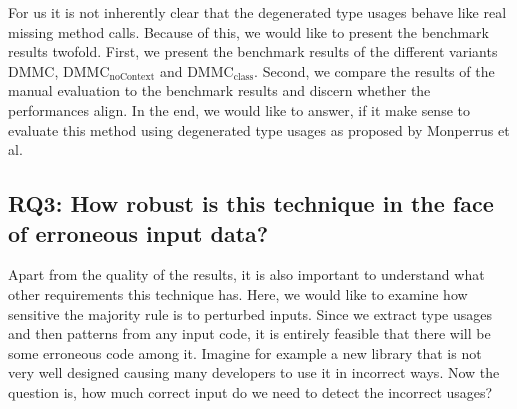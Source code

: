 For us it is not inherently clear that the degenerated type usages behave like real missing method calls.
Because of this, we would like to present the benchmark results twofold.
First, we present the benchmark results of the different variants $\text{DMMC}$, $\text{DMMC}_\text{noContext}$ and $\text{DMMC}_\text{class}$.
Second, we compare the results of the manual evaluation to the benchmark results and discern whether the performances align.
In the end, we would like to answer, if it make sense to evaluate this method using degenerated type usages as proposed by Monperrus et al.


\subsection{RQ3: How robust is this technique in the face of erroneous input data?}


Apart from the quality of the results, it is also important to understand what other requirements this technique has.
Here, we would like to examine how sensitive the majority rule is to perturbed inputs.
Since we extract type usages and then patterns from any input code, it is entirely feasible that there will be some erroneous code among it.
Imagine for example a new library that is not very well designed causing many developers to use it in incorrect ways.
Now the question is, how much correct input do we need to detect the incorrect usages?

